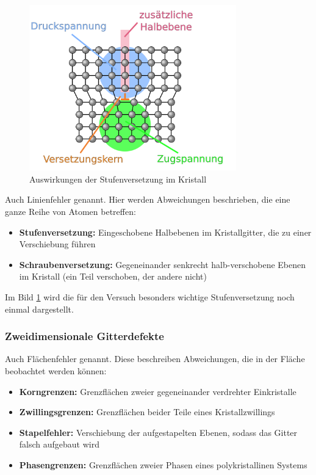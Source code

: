 \documentclass[german, %
parskip=full, %
bibliography=totoc, %
]{scrartcl}
\begin{document}
\begin{figure}[ht] 
  \centering
     \includegraphics[width=0.8\textwidth]{Stufenversetzung}
  \caption{Auswirkungen der Stufenversetzung im Kristall \cite{versetzung}}
  \label{fig:versetzung}
\end{figure}

Auch Linienfehler genannt. Hier werden Abweichungen beschrieben, die eine ganze Reihe von Atomen betreffen:
\begin{itemize}
\item \textbf{Stufenversetzung:} Eingeschobene Halbebenen im Kristallgitter, die zu einer Verschiebung führen
\item \textbf{Schraubenversetzung:} Gegeneinander senkrecht halb-verschobene Ebenen im Kristall (ein Teil verschoben, der andere nicht)
\end{itemize}
Im Bild \ref{fig:versetzung} wird die für den Versuch besonders wichtige Stufenversetzung noch einmal dargestellt.

\subsubsection{Zweidimensionale Gitterdefekte}

Auch Flächenfehler genannt. Diese beschreiben Abweichungen, die in der Fläche beobachtet werden können:
\begin{itemize}
\item \textbf{Korngrenzen:} Grenzflächen zweier gegeneinander verdrehter Einkristalle
\item \textbf{Zwillingsgrenzen:} Grenzflächen beider Teile eines Kristallzwillings
\item \textbf{Stapelfehler:} Verschiebung der aufgestapelten Ebenen, sodass das Gitter falsch aufgebaut wird
\item \textbf{Phasengrenzen:} Grenzflächen zweier Phasen eines polykristallinen Systems
\end{itemize}
\end{document}
